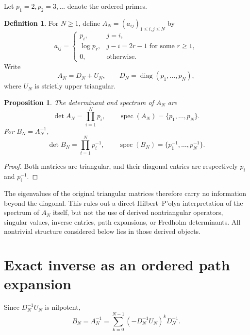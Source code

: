 \documentclass[11pt]{amsart}
\numberwithin{equation}{section}
\theoremstyle{plain}
\newtheorem{proposition}[theorem]{Proposition}
\theoremstyle{definition}
\newtheorem{definition}[theorem]{Definition}
\theoremstyle{remark}
\newcommand{\spec}{\operatorname{spec}}
\newcommand{\diag}{\operatorname{diag}}
\begin{document}
Let $p_1=2,p_2=3,\ldots$ denote the ordered primes.

\begin{definition}
\label{def:prime_index_matrix}
For $N\ge1$, define $A_N=(a_{ij})_{1\le i,j\le N}$ by
\begin{equation}
a_{ij}=
\begin{cases}
p_i,&j=i,\\
\log p_r,&j-i=2r-1\text{ for some }r\ge1,\\
0,&\text{otherwise}.
\end{cases}
\label{eq:A_definition}
\end{equation}
Write
\begin{equation}
A_N=D_N+U_N,
\qquad
D_N=\diag(p_1,\ldots,p_N),
\label{eq:D_plus_U}
\end{equation}
where $U_N$ is strictly upper triangular.
\end{definition}

\begin{proposition}
\label{prop:det_spectrum}
The determinant and spectrum of $A_N$ are
\begin{equation}
\det A_N=\prod_{i=1}^N p_i,
\qquad
\spec(A_N)=\{p_1,\ldots,p_N\}.
\label{eq:A_det_spectrum}
\end{equation}
For $B_N=A_N^{-1}$,
\begin{equation}
\det B_N=\prod_{i=1}^N p_i^{-1},
\qquad
\spec(B_N)=\{p_1^{-1},\ldots,p_N^{-1}\}.
\label{eq:B_det_spectrum}
\end{equation}
\end{proposition}

\begin{proof}
Both matrices are triangular, and their diagonal entries are respectively $p_i$ and $p_i^{-1}$.
\end{proof}

The eigenvalues of the original triangular matrices therefore carry no information beyond the diagonal.  This rules out a direct Hilbert--P'olya interpretation of the spectrum of $A_N$ itself, but not the use of derived nontriangular operators, singular values, inverse entries, path expansions, or Fredholm determinants.  All nontrivial structure considered below lies in those derived objects.

\section{Exact inverse as an ordered path expansion}
\label{sec:path_inverse}

Since $D_N^{-1}U_N$ is nilpotent,
\begin{equation}
B_N=A_N^{-1}
=\sum_{k=0}^{N-1}(-D_N^{-1}U_N)^kD_N^{-1}.
\label{eq:finite_neumann}
\end{equation}
\end{document}
